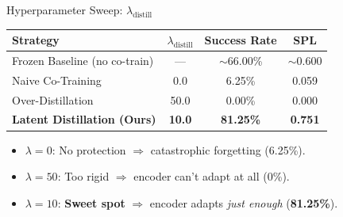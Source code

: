 \documentclass{beamer}
\begin{document}
\begin{frame}{Hyperparameter Sweep: $\lambda_{\text{distill}}$}
    \begin{table}[]
        \centering
        \renewcommand{\arraystretch}{1.3}
        \begin{tabular}{l c c c}
            \toprule
            \textbf{Strategy} & $\lambda_{\text{distill}}$ & \textbf{Success Rate} & \textbf{SPL} \\
            \midrule
            Frozen Baseline (no co-train) & --- & $\sim$66.00\% & $\sim$0.600 \\
            \textcolor{failred}{Naive Co-Training} & 0.0 & \textcolor{failred}{6.25\%} & \textcolor{failred}{0.059} \\
            \textcolor{failred}{Over-Distillation} & 50.0 & \textcolor{failred}{0.00\%} & \textcolor{failred}{0.000} \\
            \midrule
            \textcolor{successgreen}{\textbf{Latent Distillation (Ours)}} & \textbf{10.0} & \textcolor{successgreen}{\textbf{81.25\%}} & \textcolor{successgreen}{\textbf{0.751}} \\
            \bottomrule
        \end{tabular}
    \end{table}

    \vspace{0.4cm}
    \begin{itemize}
        \item $\lambda = 0$: No protection $\Rightarrow$ catastrophic forgetting (6.25\%).
        \item $\lambda = 50$: Too rigid $\Rightarrow$ encoder can't adapt at all (0\%).
        \item $\lambda = 10$: \textbf{Sweet spot} $\Rightarrow$ encoder adapts \textit{just enough} (\textbf{81.25\%}).
    \end{itemize}
\end{frame}
\end{document}
